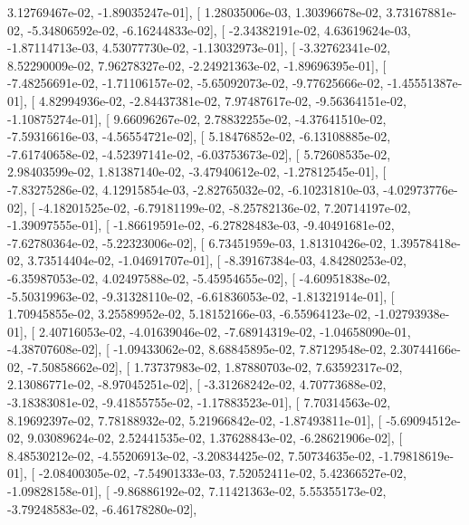 \documentclass{article}
\begin{document}
          3.12769467e-02,  -1.89035247e-01],
       [  1.28035006e-03,   1.30396678e-02,   3.73167881e-02,
         -5.34806592e-02,  -6.16244833e-02],
       [ -2.34382191e-02,   4.63619624e-03,  -1.87114713e-03,
          4.53077730e-02,  -1.13032973e-01],
       [ -3.32762341e-02,   8.52290009e-02,   7.96278327e-02,
         -2.24921363e-02,  -1.89696395e-01],
       [ -7.48256691e-02,  -1.71106157e-02,  -5.65092073e-02,
         -9.77625666e-02,  -1.45551387e-01],
       [  4.82994936e-02,  -2.84437381e-02,   7.97487617e-02,
         -9.56364151e-02,  -1.10875274e-01],
       [  9.66096267e-02,   2.78832255e-02,  -4.37641510e-02,
         -7.59316616e-03,  -4.56554721e-02],
       [  5.18476852e-02,  -6.13108885e-02,  -7.61740658e-02,
         -4.52397141e-02,  -6.03753673e-02],
       [  5.72608535e-02,   2.98403599e-02,   1.81387140e-02,
         -3.47940612e-02,  -1.27812545e-01],
       [ -7.83275286e-02,   4.12915854e-03,  -2.82765032e-02,
         -6.10231810e-03,  -4.02973776e-02],
       [ -4.18201525e-02,  -6.79181199e-02,  -8.25782136e-02,
          7.20714197e-02,  -1.39097555e-01],
       [ -1.86619591e-02,  -6.27828483e-03,  -9.40491681e-02,
         -7.62780364e-02,  -5.22323006e-02],
       [  6.73451959e-03,   1.81310426e-02,   1.39578418e-02,
          3.73514404e-02,  -1.04691707e-01],
       [ -8.39167384e-03,   4.84280253e-02,  -6.35987053e-02,
          4.02497588e-02,  -5.45954655e-02],
       [ -4.60951838e-02,  -5.50319963e-02,  -9.31328110e-02,
         -6.61836053e-02,  -1.81321914e-01],
       [  1.70945855e-02,   3.25589952e-02,   5.18152166e-03,
         -6.55964123e-02,  -1.02793938e-01],
       [  2.40716053e-02,  -4.01639046e-02,  -7.68914319e-02,
         -1.04658090e-01,  -4.38707608e-02],
       [ -1.09433062e-02,   8.68845895e-02,   7.87129548e-02,
          2.30744166e-02,  -7.50858662e-02],
       [  1.73737983e-02,   1.87880703e-02,   7.63592317e-02,
          2.13086771e-02,  -8.97045251e-02],
       [ -3.31268242e-02,   4.70773688e-02,  -3.18383081e-02,
         -9.41855755e-02,  -1.17883523e-01],
       [  7.70314563e-02,   8.19692397e-02,   7.78188932e-02,
          5.21966842e-02,  -1.87493811e-01],
       [ -5.69094512e-02,   9.03089624e-02,   2.52441535e-02,
          1.37628843e-02,  -6.28621906e-02],
       [  8.48530212e-02,  -4.55206913e-02,  -3.20834425e-02,
          7.50734635e-02,  -1.79818619e-01],
       [ -2.08400305e-02,  -7.54901333e-03,   7.52052411e-02,
          5.42366527e-02,  -1.09828158e-01],
       [ -9.86886192e-02,   7.11421363e-02,   5.55355173e-02,
         -3.79248583e-02,  -6.46178280e-02],
\end{document}
